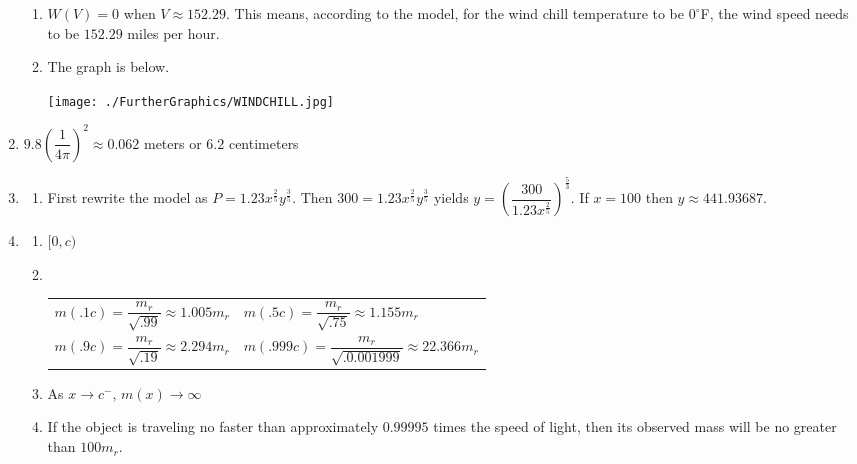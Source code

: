 \begin{enumerate}
\begin{enumerate}
\item $W(V)=0$ when $V \approx 152.29$.  This means, according to the model, for the wind chill temperature to be $0^{\circ}$F, the wind speed needs to be $152.29$ miles per hour.

\item The graph is below.  \\
\centerline{\texttt{[image: ./FurtherGraphics/WINDCHILL.jpg]}}


\end{enumerate}

\item $9.8 \left(\dfrac{1}{4\pi}\right)^{2} \approx 0.062$ meters or $6.2$ centimeters

\item \begin{enumerate}

\item First rewrite the model as $P = 1.23x^{\frac{2}{5}}y^{\frac{3}{5}}$.  Then $300 = 1.23x^{\frac{2}{5}}y^{\frac{3}{5}}$ yields $y = \left( \dfrac{300}{1.23x^{\frac{2}{5}}} \right)^{\frac{5}{3}}$.  If $x = 100$ then $y \approx 441.93687$.

\end{enumerate}

\item \begin{enumerate}

\item $[0, c)$

\item $~$

\begin{tabular}{ll} 
$m(.1c) = \dfrac{m_{r}}{\sqrt{.99}} \approx 1.005m_{r}$ & $m(.5c) = \dfrac{m_{r}}{\sqrt{.75}} \approx 1.155m_{r}$\\ \smallskip

$m(.9c) = \dfrac{m_{r}}{\sqrt{.19}} \approx 2.294m_{r}$ & $m(.999c) = \dfrac{m_{r}}{\sqrt{.0.001999}} \approx 22.366m_{r}$ \\ \end{tabular}


\item As $x \rightarrow c^{-}, \, m(x) \rightarrow \infty$

\item If the object is traveling no faster than approximately $0.99995$ times the speed of light, then its observed mass will be no greater than $100m_{r}$.

\end{enumerate}



\end{enumerate}
